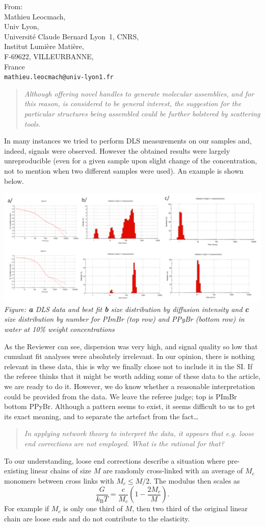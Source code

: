 \documentclass[a4paper, parskip=true, firsthead=false, fromemail=true, foldmarks=false]{scrlttr2}
\newenvironment{quotationi}
{\begin{quotation}\itshape}
{\end{quotation}}
\begin{document}
\begin{letter}{From:\\
Mathieu Leocmach,\\
Univ Lyon,\\ 
Universit\'e Claude Bernard Lyon~1, CNRS,\\
Institut Lumi\`ere Mati\`ere,\\
F-69622, VILLEURBANNE,\\
France\\
\texttt{mathieu.leocmach@univ-lyon1.fr}
}
\begin{quotationi}
Although offering novel handles to generate molecular assemblies, and for this reason, is considered to be general interest, the suggestion for the particular structures being assembled could be further bolstered by scattering tools.
\end{quotationi}

In many instances we tried to perform DLS measurements on our samples and, indeed, signals were observed. However the obtained results were largely unreproducible (even for a given sample upon slight change of the concentration, not to mention when two different samples were used). An example is shown below.

\includegraphics[width=\textwidth]{DLS.png}
\textit{Figure: \textbf{a} DLS data and best fit \textbf{b} size distribution by diffusion intensity and \textbf{c} size distribution by number for PImBr (top row) and PPyBr (bottom row) in water at 10\% weight concentrations}

As the Reviewer can see, dispersion was very high, and signal quality so low that cumulant fit analyses were absolutely irrelevant. In our opinion, there is nothing relevant in these data, this is why we finally chose not to include it in the SI. If the referee thinks that it might be worth adding some of these data to the article, we are ready to do it. However, we do know whether a reasonable interpretation could be provided from the data. We leave the referee judge; top is PImBr bottom PPyBr. Although a pattern seems to exist, it seems difficult to us to get its exact meaning, and to separate the artefact from the fact\ldots

\begin{quotationi}
In applying network theory to interpret the data, it appears that e.g. loose end corrections are not employed. What is the rational for that?
\end{quotationi}

To our understanding, loose end corrections describe a situation where pre-existing linear chains of size $M$ are randomly cross-linked with an average of $M_c$ monomers between cross links with $M_c\leq M/2$. The modulus then scales as
\begin{equation}
\frac{G}{k_\mathrm{B}T} = \frac{c}{M_c}  \left(1 - \frac{2M_c}{M}\right).
\end{equation}
For example if $M_c$ is only one third of $M$, then two third of the original linear chain are loose ends and do not contribute to the elasticity.


\end{letter}
\end{document}
